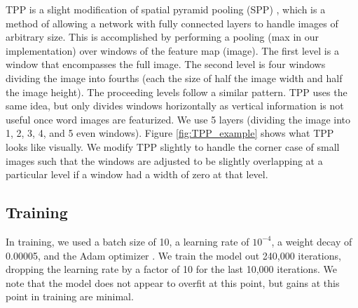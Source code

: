 \documentclass[ms,electronic,twosidetoc,letterpaper,chaptercenter,parttop,lof,lot]{byumsphd}
\begin{document}
TPP is a slight modification of spatial pyramid pooling (SPP) \cite{SPP}, which is a method of allowing a network with fully connected layers to handle images of arbitrary size. This is accomplished by performing a pooling (max in our implementation) over windows of the feature map (image). The first level is a window that encompasses the full image. The second level is four windows dividing the image into fourths (each the size of half the image width and half the image height). The proceeding levels follow a similar pattern. TPP uses the same idea, but only divides windows horizontally as vertical information is not useful once word images are featurized. We use 5 layers (dividing the image into 1, 2, 3, 4, and 5 even windows). Figure \ref{fig:TPP_example} shows what TPP looks like visually. %
We modify TPP slightly to handle the corner case of small images such that the windows are adjusted to be slightly overlapping at a particular level if a window had a width of zero at that level.




\subsection{Training}

In training, we used a batch size of 10, a learning rate of $10^{-4}$, a weight decay of 0.00005, and the Adam optimizer \cite{adam}.
We train the model out 240,000 iterations, dropping the learning rate by a factor of 10 for the last 10,000 iterations. We note that the model does not appear to overfit at this point, but gains at this point in training are minimal.
\end{document}
